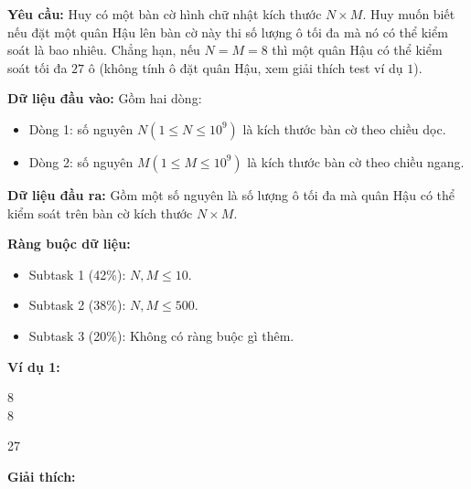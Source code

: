 \documentclass[12pt]{scrartcl}  %
\begin{document}
\textbf{Yêu cầu:}
Huy có một bàn cờ hình chữ nhật kích thước $N \times M$. Huy muốn biết nếu đặt một quân Hậu lên bàn cờ này thi số lượng ô tối đa mà nó có thể kiểm soát là bao nhiêu. Chẳng hạn, nếu $N = M = 8$ thì một quân Hậu có thể kiểm soát tối đa $27$ ô (không tính ô đặt quân Hậu, xem giải thích test ví dụ $1$).

\textbf{Dữ liệu đầu vào:}
Gồm hai dòng:
\begin{itemize}
    \item Dòng 1: số nguyên $N (1 \leq N \leq 10^9)$ là kích thước bàn cờ theo chiều dọc.
    \item Dòng 2: số nguyên $M (1 \leq M \leq 10^9)$ là kích thước bàn cờ theo chiều ngang.
\end{itemize}

\textbf{Dữ liệu đầu ra:}
Gồm một số nguyên là số lượng ô tối đa mà quân Hậu có thể kiểm soát trên bàn cờ kích thước $N \times M$.

\textbf{Ràng buộc dữ liệu:}
\begin{itemize}
    \item Subtask 1 (42\%): $N, M \leq 10$.
    \item Subtask 2 (38\%): $N, M \leq 500$.
    \item Subtask 3 (20\%): Không có ràng buộc gì thêm.
\end{itemize}

\textbf{Ví dụ 1:}
\begin{tcolorbox}[colback=gray!5!white, colframe=blue!50!black, title=Input]
8\\
8
\end{tcolorbox}
\begin{tcolorbox}[colback=gray!5!white, colframe=green!50!black, title=Output]
27
\end{tcolorbox}

\textbf{Giải thích:}
\begin{center}
\end{center}
\end{document}
